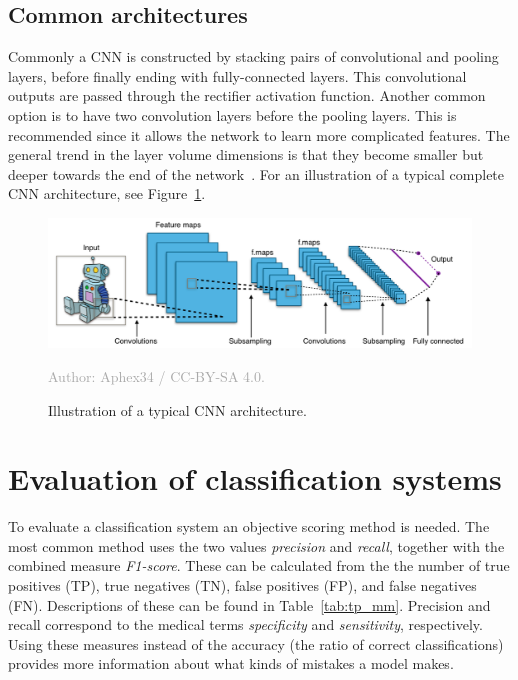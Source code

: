 \documentclass{kththesis}
\newcommand{\source}[1]{\vspace{-5mm}\caption*{\textcolor{darkgray}{Author: {#1}}\vspace{-7mm}} }
\begin{document}
\subsection{Common architectures}
Commonly a CNN is constructed by stacking pairs of convolutional and pooling layers, before finally ending with fully-connected layers. This convolutional outputs are passed through the rectifier activation function. Another common option is to have two convolution layers before the pooling layers. This is recommended since it allows the network to learn more complicated features. The general trend in the layer volume dimensions is that they become smaller but deeper towards the end of the network~\cite{cnnIntro}. For an illustration of a typical complete CNN architecture, see Figure~\ref{fig:typical_cnn}.

\begin{figure}
  \begin{center}
    \includegraphics[width=150mm]{img/typical_cnn.png}
    \caption{Illustration of a typical CNN architecture.}
    \source{Aphex34 / CC-BY-SA 4.0.}
    \label{fig:typical_cnn}
  \end{center}
\end{figure}

\section{Evaluation of classification systems}
To evaluate a classification system an objective scoring method is needed. The most common method uses the two values \textit{precision} and \textit{recall}, together with the combined measure \textit{F1-score}. These can be calculated from the the number of true positives (TP), true negatives (TN), false positives (FP), and false negatives (FN). Descriptions of these can be found in Table~\ref{tab:tp_mm}. Precision and recall correspond to the medical terms \textit{specificity} and \textit{sensitivity}, respectively. Using these measures instead of the accuracy (the ratio of correct classifications) provides more information about what kinds of mistakes a model makes.
\end{document}
